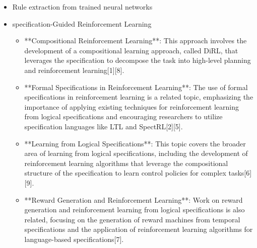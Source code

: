 \documentclass[conference]{IEEEtran}
\begin{document}
\begin{itemize}
    
    \item Rule extraction from trained neural networks
    \item specification-Guided Reinforcement Learning
    
    \begin{itemize}
        \item **Compositional Reinforcement Learning**: This approach involves the development of a compositional learning approach, called DiRL, that leverages the specification to decompose the task into high-level planning and reinforcement learning[1][8].
        \item **Formal Specifications in Reinforcement Learning**: The use of formal specifications in reinforcement learning is a related topic, emphasizing the importance of applying existing techniques for reinforcement learning from logical specifications and encouraging researchers to utilize specification languages like LTL and SpectRL[2][5].
        \item **Learning from Logical Specifications**: This topic covers the broader area of learning from logical specifications, including the development of reinforcement learning algorithms that leverage the compositional structure of the specification to learn control policies for complex tasks[6][9].
        \item **Reward Generation and Reinforcement Learning**: Work on reward generation and reinforcement learning from logical specifications is also related, focusing on the generation of reward machines from temporal specifications and the application of reinforcement learning algorithms for language-based specifications[7].
        
    \end{itemize}

\end{itemize}
\end{document}
